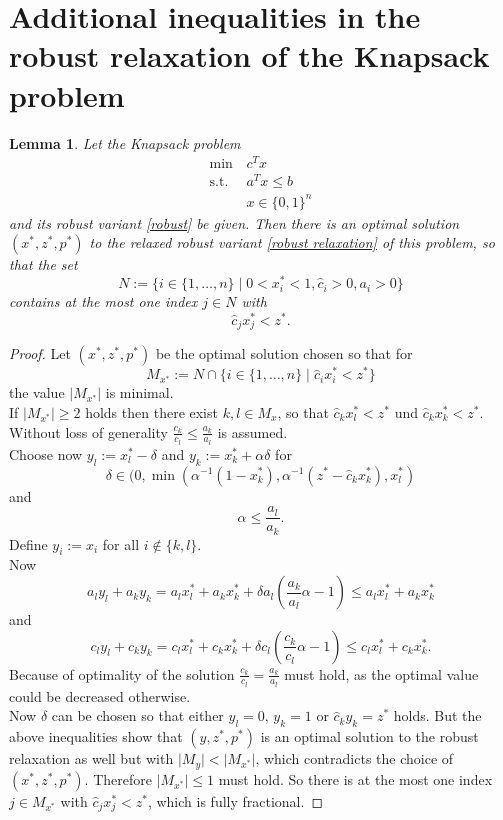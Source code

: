 \documentclass[titlepage, a4paper]{amsbook}
\theoremstyle{plain}
\newtheorem{lem}[thm]{Lemma}
\theoremstyle{break}
\theoremstyle{definition}
\theoremstyle{remark}
\numberwithin{equation}{thm}
\begin{document}
\section{Additional inequalities in the robust relaxation of the Knapsack problem}
\begin{lem}\label{lem: fractional knapsack in robust relaxation}
Let the Knapsack problem 
\begin{align*}
    \min\, &c^Tx \\
    \text{s.t. } &a^Tx \leq b \\
    &x \in \{0,1\}^n
\end{align*}
and its robust variant \eqref{robust} be given. Then there is an optimal solution $(x^*,z^*,p^*)$ to the relaxed robust variant \eqref{robust relaxation} of this problem,
so that the set 
\[N:=\{i \in \{1, \ldots, n\} \mid 0< x^*_i <1, \hat{c}_i > 0 , a_i >0 \}\]
contains at the most one index $j \in N$ with 
\[\hat{c}_j x^*_j < z^*.\]
\end{lem}
\begin{proof}
Let $(x^*,z^*,p^*)$ be the optimal solution chosen so that for
\[M_{x^*}:=N \cap \{i \in \{1, \ldots, n\} \mid \hat{c}_ix^*_i < z^*\}\]
the value $\vert M_{x^*} \vert$ is minimal. \\
If $\vert M_{x^*} \vert \geq 2$ holds then there exist $k,l \in M_x$, so that $\hat{c}_kx^*_l < z^*$ und $\hat{c}_kx^*_k < z^*$. Without loss of generality $\frac{c_k}{c_l} \leq \frac{a_k}{a_l}$ is assumed.\\
Choose now $y_l:=x^*_l-\delta$ and $y_k:=x^*_k+\alpha \delta$
for 
\[\delta \in (0, \min(\alpha^{-1}(1-x^*_k),\alpha^{-1}(z^*-\hat{c}_k x^*_k), x^*_l)\] and 
\[\alpha \leq \frac{a_l}{a_k}.\] Define $y_i:=x_i$ for all $i \notin \{k,l\}$. \\
Now 
\[a_l y_l + a_k y_k = a_l x^*_l + a_k x^*_k + \delta a_l ( \frac{a_k}{a_l}\alpha-1) \leq a_l x^*_l + a_k x^*_k\]
and
\[c_l y_l + c_k y_k = c_l x^*_l + c_k x^*_k + \delta c_l (\frac{c_k}{c_l} \alpha - 1) \leq c_l x^*_l + c_k x^*_k .\]
Because of optimality of the solution $\frac{c_k}{c_l} = \frac{a_k}{a_l}$ must hold, as the optimal value could be decreased otherwise. \\ 
Now $\delta$ can be chosen so that either $y_l=0$, $y_k=1$ or $\hat{c}_ky_k=z^*$ holds. But the above inequalities show that $(y, z^*, p^*)$ is an optimal solution to the robust relaxation as well but with $\vert M_y \vert < \vert M_{x^*} \vert$, which contradicts the choice of $(x^*,z^*,p^*)$. Therefore $\vert M_{x^*} \vert \leq 1$ must hold. So there is at the most one index $j \in M_{x^*}$ with $\hat{c}_jx^*_j < z^*$, which is fully fractional. 
\end{proof}
\end{document}

